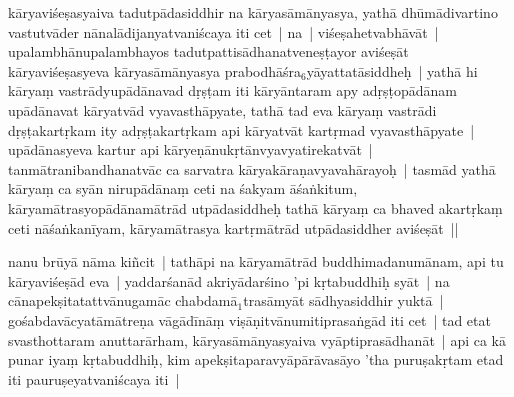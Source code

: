 \documentclass[article,12pt,a4paper]{memoir}%
\newcommand{\gap}[1]{}
\newcounter{parCount}
\begin{document}
	  \pstart \leavevmode%
	\label{thakur75-37.16}kāryaviśeṣasyaiva tadutpādasiddhir na kā\gap{}ryasāmānyasya, yathā dhūmādivartino vastutvāder nānalādijanyatvaniścaya iti cet | na | viśeṣahetvabhāvāt | upalambhānupalambhayos tadutpattisādhanatveneṣṭayor aviśeṣāt kāryaviśeṣasyeva kāryasāmānyasya prabodhāśra{\tiny $_{6}$}yāyattatāsiddheḥ |\label{rnā__97385} yathā hi kāryaṃ vastrādyupādānavad \label{ratnakīrtinibandhāvali__36r1PF7IMWLD7EYP7VS6KY50CFW}dṛṣṭam iti\label{ratnakīrtinibandhāvali__36r1PF7IMWKOTSRMOPVD0OSH4J8} kāryāntaram apy adṛṣṭopādānam upādānavat \label{ratnakīrtinibandhāvali__36r1PF7IMWK15LWUW1A687BTMQB}kāryatvād vyavasthāpyate\label{ratnakīrtinibandhāvali__36r1PF7IMWJCSS30GYR134GAMFI}, tathā tad eva kāryaṃ vastrādi dṛṣṭakartṛkam ity adṛṣṭakartṛkam api kāryatvāt kartṛmad vyavasthāpyate | upādānasyeva kartur api kāryeṇānukṛtānvyavyatirekatvāt | tanmātranibandhanatvāc ca sarvatra kāryakāraṇavyavahārayoḥ | tasmād yathā kārya\leavevmode{}\label{RNAms_21b}ṃ ca syān nirupādānaṃ ceti na śakyam āśaṅkitum, kāryamātrasyopādānamātrād utpādasiddheḥ tathā kāryaṃ ca bhaved akartṛkaṃ ceti nāśaṅkanīyam, kāryamātrasya kartṛmātrād utpādasiddher aviśeṣāt ||\label{thakur-75-37.26}
	{}
	\pend%
      

	  \pstart \leavevmode%
	\label{thakur75-37.26}nanu brūyā nāma kiñcit | tathāpi na kāryamātrād buddhimadanumānam, api tu kāryaviśeṣād eva | yaddarśanād akriyādarśino 'pi kṛtabuddhiḥ syāt | na cānapekṣitatattvānugamāc chabdamā{\tiny $_{1}$}trasāmyāt sādhyasiddhir yuktā | gośabdavācyatāmātreṇa vāgādīnāṃ viṣāṇitvānumitiprasaṅgād iti cet | tad etat svasthottaram anuttarārham, kāryasāmānyasyaiva vyāptiprasādhanāt | api ca kā punar iyaṃ kṛtabuddhiḥ, kim apekṣitaparavyāpārāvasāyo 'tha puruṣakṛtam etad iti pauruṣeyatvaniścaya iti |
	{}
	\pend%
      
\end{document}
